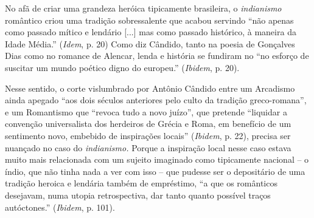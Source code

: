 No afã de criar uma grandeza heróica tipicamente brasileira, o
\emph{indianismo} romântico criou uma tradição sobressalente que acabou
servindo ``não apenas como passado mítico e lendário {[}...{]} mas como
passado histórico, à maneira da Idade Média.'' (\emph{Idem}, p. 20) Como
diz Cândido, tanto na poesia de Gonçalves Dias como no romance de
Alencar, lenda e história se fundiram no ``no esforço de suscitar um
mundo poético digno do europeu.'' (\emph{Ibidem}, p. 20).

Nesse sentido, o corte vislumbrado por Antônio Cândido entre um
Arcadismo ainda apegado ``aos dois séculos anteriores pelo culto da
tradição greco-romana'', e um Romantismo que ``revoca tudo a novo
juízo'', que pretende ``liquidar a convenção universalista dos herdeiros
de Grécia e Roma, em benefício de um sentimento novo, embebido de
inspirações locais'' (\emph{Ibidem}, p. 22), precisa ser nuançado no
caso do \emph{indianismo.} Porque a inspiração local nesse caso estava
muito mais relacionada com um sujeito imaginado como tipicamente
nacional -- o índio, que não tinha nada a ver com isso -- que pudesse
ser o depositário de uma tradição heroica e lendária também de
empréstimo, ``a que os românticos desejavam, numa utopia retrospectiva,
dar tanto quanto possível traços autóctones.'' (\emph{Ibidem}, p. 101).


